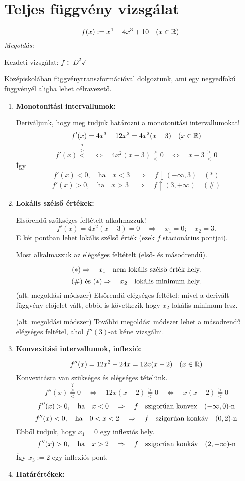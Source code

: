 \documentclass[a4paper,11.5pt]{article}
\begin{document}
	\section{Teljes függvény vizsgálat}
	\begin{task}
		\[ f(x):=x^4-4x^3+10\quad (x\in\mathbb{R}) \]
		\textit{Megoldás:}
		
		Kezdeti vizsgálat: $f\in D^2\checkmark$
		\begin{note}
			Középiskolában függvénytranszformációval dolgoztunk, ami egy negyedfokú függvényél aligha lehet célravezető.
		\end{note}
		\begin{enumerate}
			\item \textbf{Monotonitási intervallumok:}
			
			Deriváljunk, hogy meg tudjuk határozni a monotonitási intervallumokat!
			\[ f'(x)=4x^3-12x^2=4x^2(x-3)\quad (x\in\mathbb{R}) \]
			$$f'(x)\overset{?}{\overset{>}{\underset{=}{<}}}\quad \Leftrightarrow\quad 4x^2(x-3)\overset{>}{\underset{<}{=}}0\quad \Leftrightarrow\quad x-3\overset{>}{\underset{<}{=}}0 $$
			Így
			\[ f'(x)<0,\quad \text{ha}\quad x<3\quad \Rightarrow\quad f\downarrow (-\infty,3) \quad (*) \]
			\[ f'(x)>0,\quad \text{ha}\quad x>3\quad \Rightarrow\quad f\uparrow (3,+\infty)\quad (\#) \]
			\item \textbf{Lokális szélső értékek:}
			
			Elsőrendű szükséges feltételt alkalmazzuk!
			\[ f'(x)=4x^2(x-3)=0\quad \Rightarrow\quad x_1=0;\quad x_2=3. \]
			E két pontban lehet lokális szélső érték (ezek $f$ stacionárius pontjai).
			
			Most alkalmazzuk az elégséges feltételt (első- és másodrendű).
			
			\[ (*)\Rightarrow\quad x_1 \text{\quad nem lokális szélső érték hely.} \]
			\[ (\#) \text{\ és\ } (*)\Rightarrow\quad x_2 \text{\quad lokális minimum hely.} \]
			(alt. megoldási módszer) Elsőrendű elégséges feltétel: mivel a derivált függvény előjelet vált, ebből is következik hogy $x_2$ lokális minimum lesz.
			
			(alt. megoldási módszer) További megoldási módszer lehet a másodrendű elégséges feltétel, ahol $f''(3)$-at kéne vizsgálni.
			\item \textbf{Konvexitási intervallumok, inflexió:}
			
			\[ f''(x)=12x^2-24x=12x(x-2)\quad (x\in\mathbb{R}) \]
			Konvexitásra van szükséges és elégséges tételünk.
			\[ f''(x)\overset{?}{\overset{>}{\underset{<}{=}}}0\quad \Leftrightarrow\quad 12x(x-2)\overset{>}{\underset{<}{=}}0\quad \Leftrightarrow\quad x(x-2)\overset{>}{\underset{<}{=}}0 \]
			\[ f''(x)>0,\quad \text{ha}\quad x<0\quad \Rightarrow\quad f \text{\quad szigorúan konvex}\quad (-\infty,0)\text{-n} \]
			\[ f''(x)<0,\quad \text{ha}\quad 0<x<2\quad \Rightarrow\quad f \text{\quad szigorúan konkáv}\quad (0,2)\text{-n} \]
			Ebből tudjuk, hogy $x_1=0$ egy inflexiós hely.
			\[ f''(x)>0,\quad \text{ha}\quad x>2\quad \Rightarrow\quad f \text{\quad szigorúan konkáv}\quad (2,+\infty)\text{-n} \]
			Így $x_3:=2$ egy inflexiós pont.
			\item \textbf{Határértékek:}
			

\end{enumerate}
\end{task}
\end{document}
